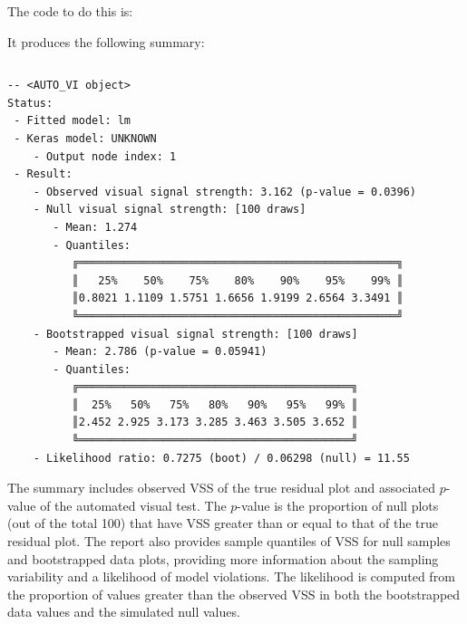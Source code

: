 \documentclass[
doublespace,
  times]{anzsauth}
\newenvironment{Shaded}{\begin{snugshade}}{\end{snugshade}}
\newcommand{\AttributeTok}[1]{\textcolor[rgb]{0.40,0.45,0.13}{#1}}
\newcommand{\FunctionTok}[1]{\textcolor[rgb]{0.28,0.35,0.67}{#1}}
\newcommand{\NormalTok}[1]{\textcolor[rgb]{0.00,0.23,0.31}{#1}}
\newcommand{\OtherTok}[1]{\textcolor[rgb]{0.00,0.23,0.31}{#1}}
\newcommand{\SpecialCharTok}[1]{\textcolor[rgb]{0.37,0.37,0.37}{#1}}
\begin{document}
The code to do this is:

\begin{Shaded}
\end{Shaded}

It produces the following summary:

\begin{verbatim}
\end{verbatim}

\begin{verbatim}
-- <AUTO_VI object>
Status:
 - Fitted model: lm
 - Keras model: UNKNOWN
    - Output node index: 1
 - Result:
    - Observed visual signal strength: 3.162 (p-value = 0.0396)
    - Null visual signal strength: [100 draws]
       - Mean: 1.274
       - Quantiles: 
          ╔═════════════════════════════════════════════════╗
          ║   25%    50%    75%    80%    90%    95%    99% ║
          ║0.8021 1.1109 1.5751 1.6656 1.9199 2.6564 3.3491 ║
          ╚═════════════════════════════════════════════════╝
    - Bootstrapped visual signal strength: [100 draws]
       - Mean: 2.786 (p-value = 0.05941)
       - Quantiles: 
          ╔══════════════════════════════════════════╗
          ║  25%   50%   75%   80%   90%   95%   99% ║
          ║2.452 2.925 3.173 3.285 3.463 3.505 3.652 ║
          ╚══════════════════════════════════════════╝
    - Likelihood ratio: 0.7275 (boot) / 0.06298 (null) = 11.55 
\end{verbatim}

The summary includes observed VSS of the true residual plot and
associated \(p\)-value of the automated visual test. The \(p\)-value is
the proportion of null plots (out of the total 100) that have VSS
greater than or equal to that of the true residual plot. The report also
provides sample quantiles of VSS for null samples and bootstrapped data
plots, providing more information about the sampling variability and a
likelihood of model violations. The likelihood is computed from the
proportion of values greater than the observed VSS in both the
bootstrapped data values and the simulated null values.
\end{document}

